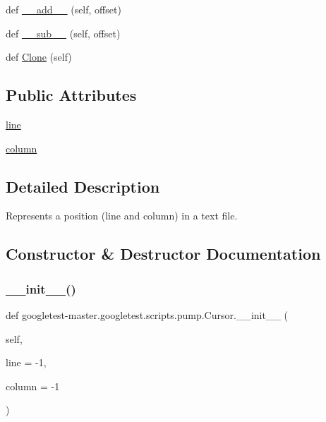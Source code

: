 \begin{DoxyCompactItemize}
\item 
def \mbox{\hyperlink{classgoogletest-master_1_1googletest_1_1scripts_1_1pump_1_1_cursor_a231b5d8ac0e2b0106aa79ace784f8fad}{\+\_\+\+\_\+add\+\_\+\+\_\+}} (self, offset)
\item 
def \mbox{\hyperlink{classgoogletest-master_1_1googletest_1_1scripts_1_1pump_1_1_cursor_a5c823bfba7fcce81f7b54f5fdcbe56ab}{\+\_\+\+\_\+sub\+\_\+\+\_\+}} (self, offset)
\item 
def \mbox{\hyperlink{classgoogletest-master_1_1googletest_1_1scripts_1_1pump_1_1_cursor_a5af189d84523793eedfa18cfb0d07b93}{Clone}} (self)
\end{DoxyCompactItemize}
\subsection*{Public Attributes}
\begin{DoxyCompactItemize}
\item 
\mbox{\hyperlink{classgoogletest-master_1_1googletest_1_1scripts_1_1pump_1_1_cursor_ae223ac7e9a32aab12d78ff9a43bdd250}{line}}
\item 
\mbox{\hyperlink{classgoogletest-master_1_1googletest_1_1scripts_1_1pump_1_1_cursor_a963de3452b99715edfe4d3e0efe2727f}{column}}
\end{DoxyCompactItemize}


\subsection{Detailed Description}
\begin{DoxyVerb}Represents a position (line and column) in a text file.\end{DoxyVerb}
 

\subsection{Constructor \& Destructor Documentation}
\mbox{\label{classgoogletest-master_1_1googletest_1_1scripts_1_1pump_1_1_cursor_a7557d2a355fd7708f6c60535fe30eea7}} 
\subsubsection{\texorpdfstring{\_\_init\_\_()}{\_\_init\_\_()}}
{\footnotesize\ttfamily def googletest-\/master.\+googletest.\+scripts.\+pump.\+Cursor.\+\_\+\+\_\+init\+\_\+\+\_\+ (\begin{DoxyParamCaption}\item[{}]{self,  }\item[{}]{line = {\ttfamily -\/1},  }\item[{}]{column = {\ttfamily -\/1} }\end{DoxyParamCaption})}



